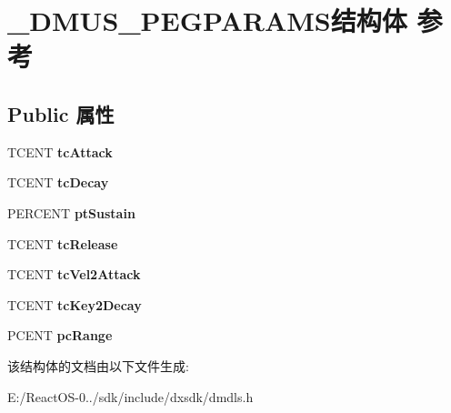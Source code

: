 \hypertarget{struct___d_m_u_s___p_e_g_p_a_r_a_m_s}{}\section{\+\_\+\+D\+M\+U\+S\+\_\+\+P\+E\+G\+P\+A\+R\+A\+M\+S结构体 参考}
\label{struct___d_m_u_s___p_e_g_p_a_r_a_m_s}
\subsection*{Public 属性}
\begin{DoxyCompactItemize}
\item 
\mbox{\label{struct___d_m_u_s___p_e_g_p_a_r_a_m_s_af8eadbc7a6dcc073b6e77d914e85ff0b}} 
T\+C\+E\+NT {\bfseries tc\+Attack}
\item 
\mbox{\label{struct___d_m_u_s___p_e_g_p_a_r_a_m_s_aeb0a464db4500cfc1c48731b59a76a53}} 
T\+C\+E\+NT {\bfseries tc\+Decay}
\item 
\mbox{\label{struct___d_m_u_s___p_e_g_p_a_r_a_m_s_ac54267c650460ebad20ee7b8023fab14}} 
P\+E\+R\+C\+E\+NT {\bfseries pt\+Sustain}
\item 
\mbox{\label{struct___d_m_u_s___p_e_g_p_a_r_a_m_s_a0e9d54c352edf204f2437da71cf3e74e}} 
T\+C\+E\+NT {\bfseries tc\+Release}
\item 
\mbox{\label{struct___d_m_u_s___p_e_g_p_a_r_a_m_s_abd8f25631732c92625c73af7bea7f1b8}} 
T\+C\+E\+NT {\bfseries tc\+Vel2\+Attack}
\item 
\mbox{\label{struct___d_m_u_s___p_e_g_p_a_r_a_m_s_a9715974831e6976c2c174c1170544d53}} 
T\+C\+E\+NT {\bfseries tc\+Key2\+Decay}
\item 
\mbox{\label{struct___d_m_u_s___p_e_g_p_a_r_a_m_s_a236680248b6a59fc7e7116534ac3fa0f}} 
P\+C\+E\+NT {\bfseries pc\+Range}
\end{DoxyCompactItemize}


该结构体的文档由以下文件生成\+:\begin{DoxyCompactItemize}
\item 
E\+:/\+React\+O\+S-\/0../sdk/include/dxsdk/dmdls.\+h\end{DoxyCompactItemize}
